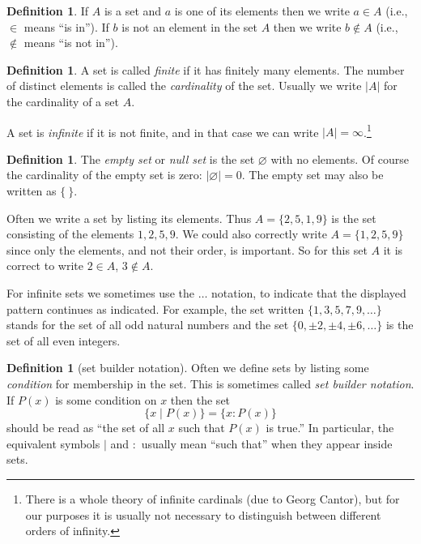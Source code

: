 \documentclass[11pt]{article}
\theoremstyle{definition}
\newtheorem{defn}[thm]{Definition}
\begin{document}
\begin{defn}
  If $A$ is a set and $a$ is one of its elements then we write $a\in
  A$ (i.e., $\in$ means ``is in'').  If $b$ is not an element in the
  set $A$ then we write $b\notin A$ (i.e., $\notin$ means ``is not
  in'').
\end{defn}

\begin{defn}
  A set is called {\em finite} if it has finitely many elements.  The
  number of distinct elements is called the {\em
    cardinality} of the set.  Usually we write
  $|A|$ for the cardinality of a set $A$.
\end{defn}

A set is {\em infinite} if it is not finite, and in that case we can
write $|A|=\infty$.\footnote{There is a whole theory of infinite
  cardinals (due to Georg Cantor), but for our purposes it is usually
  not necessary to distinguish between different orders of infinity.}

\begin{defn}
  The {\em empty set} or {\em null set} is the set
  $\varnothing$ with no elements.  Of course the cardinality of the
  empty set is zero: $|\varnothing| = 0$.  The empty set may also be
  written as $\{\ \}$.
\end{defn}


Often we write a set by listing its elements. Thus $A=\{ 2, 5, 1, 9
\}$ is the set consisting of the elements $1,2,5,9$. We could also
correctly write $A = \{1,2,5,9\}$ since only the elements, and not
their order, is important. So for this set $A$ it is correct to write
$2\in A$, $3\notin A$.

For infinite sets we sometimes use the $\dots$ notation, to indicate
that the displayed pattern continues as indicated. For example, the
set written $\{1,3,5,7,9,\dots\}$ stands for the set of all odd
natural numbers and the set $\{0, \pm2, \pm4, \pm6, \dots \}$ is the
set of all even integers.


\begin{defn}[set builder notation]
Often we define sets by listing some \emph{condition} for membership
in the set. This is sometimes called \emph{set builder notation}. If
$P(x)$ is some condition on $x$ then the set
\[
  \{x \mid P(x) \} = \{x : P(x) \}
\]
should be read as ``the set of all $x$ such that $P(x)$ is true.''  In
particular, the equivalent symbols $|$ and $:$ usually mean ``such
that'' when they appear inside sets.
\end{defn}
\end{document}
